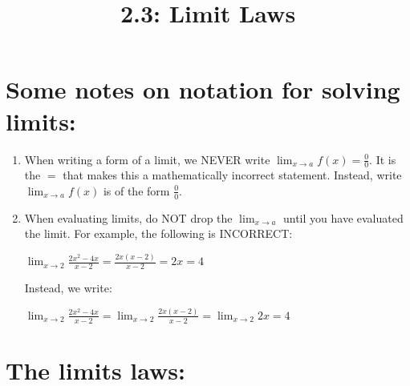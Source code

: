\documentclass[nooutcomes]{ximera}
\title{2.3:  Limit Laws}
\begin{document}
\begin{abstract}		\end{abstract}
\maketitle

\section{Some notes on notation for solving limits:}
\begin{enumerate}
	\item When writing a form of a limit, we NEVER write $\lim_{x \to a}f(x)=\frac{0}{0}$.  It is the $=$ that makes this a mathematically incorrect statement.  Instead, write $\lim_{x \to a}f(x)$ is of the form $\frac{0}{0}$.

	\item When evaluating limits, do NOT drop the $\lim_{x \to a}$ until you have evaluated the limit.  For example, the following is INCORRECT:
	\begin{center}
	$\lim_{x \to 2}\frac{2x^2-4x}{x-2}=\frac{2x(x-2)}{x-2}=2x=4$\\	
	\end{center}

	Instead, we write: 
		\begin{center}
	$\lim_{x \to 2}\frac{2x^2-4x}{x-2}=\lim_{x \to 2}\frac{2x(x-2)}{x-2}=\lim_{x \to 2}2x=4$\\	
	\end{center}

\end{enumerate}

 \section{The limits laws:}
  
\end{document}

